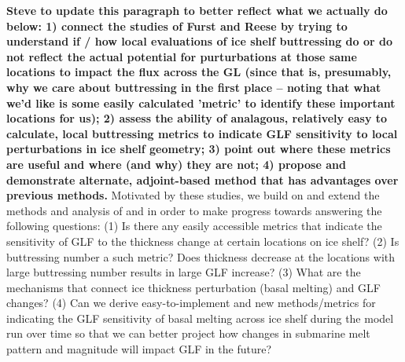 \documentclass[tc, manuscript]{copernicus}
\begin{document}


\textbf{Steve to update this paragraph to better reflect what we actually do below: 1) connect the studies of Furst and Reese by trying to understand if / how local evaluations of ice shelf buttressing do or do not reflect the actual potential for purturbations at those same locations to impact the flux across the GL (since that is, presumably, why we care about buttressing in the first place -- noting that what we'd like is some easily calculated 'metric' to identify these important locations for us); 2) assess the ability of analagous, relatively easy to calculate, local buttressing metrics to indicate GLF sensitivity to local perturbations in ice shelf geometry; 3) point out where these metrics are useful and where (and why) they are not; 4) propose and demonstrate alternate, adjoint-based method that has advantages over previous methods.}
Motivated by these studies, we build on and extend the methods and analysis of \citet{furst2016} and \citet{reese2018} in order to make progress towards answering the following questions: 
(1) Is there any easily accessible metrics that indicate the sensitivity of GLF to the thickness change at certain locations on ice shelf?
(2) Is buttressing number a such metric? Does thickness decrease at the locations with large buttressing number results in large GLF increase?
(3) What are the mechanisms that connect ice thickness perturbation (basal melting) and GLF changes?
(4) Can we derive easy-to-implement and new methods/metrics for indicating the GLF sensitivity of basal melting across ice shelf during the model run over time so that we can better project how changes in submarine melt pattern and magnitude will impact GLF in the future?  
\end{document}
